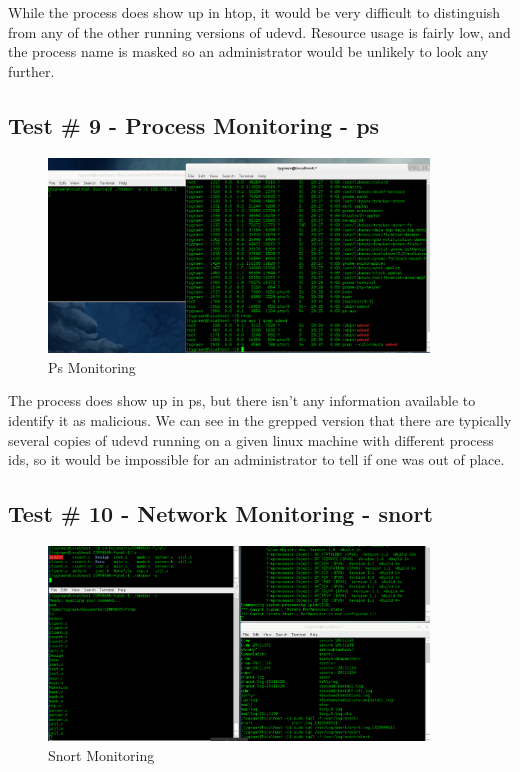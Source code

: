 \documentclass[titlepage]{article}
\begin{document}
While the process does show up in htop, it would be very difficult to distinguish from any of the other running versions of udevd.  Resource usage is fairly low, and the process name is masked so an administrator would be unlikely to look any further.

\subsection{Test \# 9 - Process Monitoring - ps}

\begin{figure}[htb]                                                                       
  \begin{center}
    \includegraphics[width=0.9\textwidth]{Pictures/ps.png}
  \end{center}
  \caption{Ps Monitoring}
  \label{fig:ps}
\end{figure}

The process does show up in ps, but there isn't any information available to identify it as malicious. We can see in the grepped version that there are typically several copies of udevd running on a given linux machine with different process ids, so it would be impossible for an administrator to tell if one was out of place.  

\clearpage

\subsection{Test \# 10 - Network Monitoring - snort}

\begin{figure}[htb]                                                                       
  \begin{center}
    \includegraphics[width=0.9\textwidth]{Pictures/snort.png}
  \end{center}
  \caption{Snort Monitoring}
  \label{fig:snort}
\end{figure}
\end{document}
